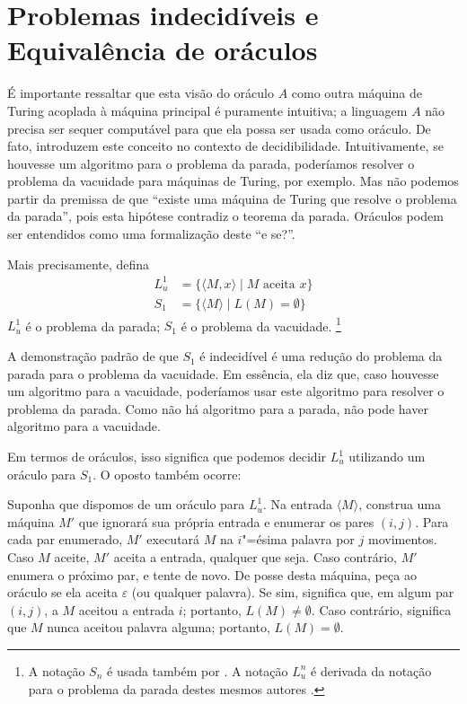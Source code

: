 \section{Problemas indecidíveis e Equivalência de oráculos}
\label{sec:oracle_equivalence}

É importante ressaltar que esta visão do oráculo $A$
como outra máquina de Turing acoplada à máquina principal
é puramente intuitiva;
a linguagem $A$ não precisa ser sequer computável
para que ela possa ser usada como oráculo.
De fato, 
introduzem este conceito no contexto de decidibilidade.
Intuitivamente, se houvesse um algoritmo para o problema da parada,
poderíamos resolver o problema da vacuidade para máquinas de Turing,
por exemplo.
Mas não podemos partir da premissa de que
``existe uma máquina de Turing que resolve o problema da parada'',
pois esta hipótese contradiz o teorema da parada.
Oráculos podem ser entendidos como uma formalização deste ``e se?''.

Mais precisamente, defina
\begin{align*}
    L_u^1 &= \{ \langle M, x \rangle \mid M \text{ aceita } x \} \\
    S_1 &= \{ \langle M \rangle \mid L(M) = \emptyset \}
\end{align*}
$L_u^1$ é o problema da parada; $S_1$ é o problema da vacuidade.%
\footnote{
    A notação $S_n$ é usada também por .
    A notação $L_u^n$ é derivada da notação para o problema da parada
    destes mesmos autores \cite[p.~183]{HopcroftUllman1979}.
}

A demonstração padrão de que $S_1$ é indecidível
é uma redução do problema da parada para o problema da vacuidade.
Em essência, ela diz que,
caso houvesse um algoritmo para a vacuidade,
poderíamos usar este algoritmo para resolver o problema da parada.
Como não há algoritmo para a parada,
não pode haver algoritmo para a vacuidade.

Em termos de oráculos,
isso significa que podemos decidir $L_u^1$
utilizando um oráculo para $S_1$.
O oposto também ocorre:

Suponha que dispomos de um oráculo para $L_u^1$.
Na entrada $\langle M \rangle$,
construa uma máquina $M'$ que ignorará sua própria entrada
e enumerar os pares $(i, j)$.
Para cada par enumerado,
$M'$ executará $M$ na $i$"=ésima palavra por $j$ movimentos.
Caso $M$ aceite, $M'$ aceita a entrada, qualquer que seja.
Caso contrário, $M'$ enumera o próximo par, e tente de novo.
De posse desta máquina, peça ao oráculo se ela aceita $\varepsilon$
(ou qualquer palavra).
Se sim, significa que, em algum par $(i, j)$,
a $M$ aceitou a entrada $i$; portanto, $L(M) \neq \emptyset$.
Caso contrário, significa que $M$ nunca aceitou palavra alguma;
portanto, $L(M) = \emptyset$.

